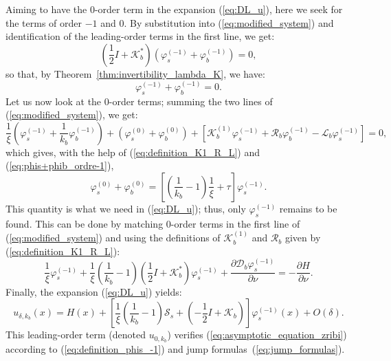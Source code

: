 \documentclass[final]{siamltex}
\numberwithin{equation}{section}
\numberwithin{figure}{section}
\numberwithin{table}{section}
\begin{document}
 Aiming to have the $0$-order term in the expansion (\ref{eq:DL_u}),
here we seek for the terms of order $-1$ and $0$. By substitution
into (\ref{eq:modified_system}) and identification of the leading-order
terms in the first line, we get:
\[
\left(\frac{1}{2}I+\mathcal{K}_{b}^{*}\right)\left(\varphi_{s}^{(-1)}+\varphi_{b}^{(-1)}\right)=0,
\]
 so that, by Theorem~\ref{thm:invertibility_lambda_K}, we have:
\begin{equation}
\varphi_{s}^{(-1)}+\varphi_{b}^{(-1)}=0.\label{eq:phis+phib_ordre-1}
\end{equation}
 Let us now look at the $0$-order terms; summing the two lines of (\ref{eq:modified_system}), we
get:
\[
\frac{1}{\xi}\left(\varphi_{s}^{(-1)}+\frac{1}{k_{b}}\varphi_{b}^{(-1)}\right)+(\varphi_{s}^{(0)}+\varphi_{b}^{(0)})
+
\left[\mathcal{K}_{b}^{(1)}\varphi_{s}^{(-1)}+\mathcal{R}_{b}\varphi_{b}^{(-1)}-\mathcal{L}_{b}\varphi_{s}^{(-1)}\right]=0,
\]
 which gives, with the help of (\ref{eq:definition_K1_R_L}) and (\ref{eq:phis+phib_ordre-1}),
\begin{equation}
\varphi_{s}^{(0)}+\varphi_{b}^{(0)}=\left[\left(\frac{1}{k_{b}}-1\right)
\frac{1}{\xi}
+\tau\right]\varphi_{s}^{(-1)}.\label{eq:phis0+phib0}
\end{equation}
 This quantity is what we need in (\ref{eq:DL_u}); thus, only $\varphi_{s}^{(-1)}$
remains to be found. This can be done by matching $0$-order terms
in the first line of (\ref{eq:modified_system}) and using the
definitions of $\mathcal{K}_{b}^{(1)}$ and $\mathcal{R}_{b}$ given
by (\ref{eq:definition_K1_R_L}):
\begin{equation}
\frac{1}{\xi}\varphi_{s}^{(-1)}+\frac{1}{\xi}\left(\frac{1}{k_{b}}-1\right)\left(\frac{1}{2}I+\mathcal{K}_{b}^{*}\right)\varphi_{s}^{(-1)}+\frac{\partial\mathcal{D}_{b}\varphi_{s}^{(-1)}}{\partial\nu}=-\frac{\partial
H}{\partial\nu}.\label{eq:definition_phis_-1}
\end{equation}
 Finally, the expansion (\ref{eq:DL_u}) yields:
\begin{equation}
u_{\delta,k_{b}}(x)=H(x)+\left[\frac{1}{\xi}\left(\frac{1}{k_{b}}-1\right)\mathcal{S}_{s}+\left(-\frac{1}{2}I+\mathcal{K}_{b}\right)\right]\varphi_{s}^{(-1)}(x)+O(\delta).\label{eq:u_delta_sigma_ordre1}
\end{equation}
 This leading-order term (denoted $u_{0,k_{b}}$) verifies (\ref{eq:asymptotic_equation_zribi})
according to (\ref{eq:definition_phis_-1}) and jump formulas~(\ref{eq:jump_formulas}).
\end{document}
